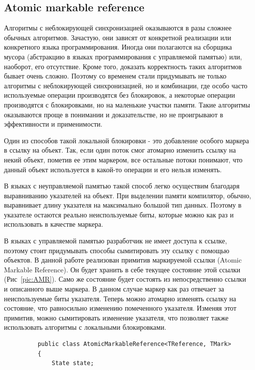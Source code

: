 \documentclass[12pt]{article}
\begin{document}
{			\subsection{Atomic markable reference}
				\par Алгоритмы с неблокирующей синхронизацией оказываются в разы сложнее обычных алгоритмов. Зачастую, они зависят от конкретной реализации или конкретного языка программирования. Иногда они полагаются на сборщика мусора (абстракцию в языках программирования с управляемой памятью) или, наоборот, его отсутствие. Кроме того, доказать корректность таких алгоритмов бывает очень сложно. Поэтому со временем стали придумывать не только алгоритмы с неблокирующей синхронизацией, но и комбинации, где особо часто используемые операции производятся без блокировок, а некоторые операции производятся с блокировками, но на маленькие участки памяти. Такие алгоритмы оказываются проще в понимании и доказательстве, но не проигрывают в эффективности и применимости.  
				\par Один из способов такой локальной блокировки - это добавление особого маркера в ссылку на объект. Так, если один поток смог атомарно изменить ссылку на некий объект, пометив ее этим маркером, все остальные потоки понимают, что данный объект используется в какой-то операции и его нельзя изменять. 
				\par В языках с неуправляемой памятью такой способ легко осуществим благодаря выравниванию указателей на объект. При выделении памяти компилятор, обычно, выравнивает длину указателя на максимально большой тип данных. Поэтому в указателе остаются реально неиспользуемые биты, которые можно как раз и использовать в качестве маркера.
				\par В языках с управляемой памятью разработчик не имеет доступа к ссылке, поэтому стоит придумывать способы сымитировать эту ссылку с помощью объектов. В данной работе реализован примитив маркируемой ссылки (Atomic Markable Reference). Он будет хранить в себе текущее состояние этой ссылки (Рис~\ref{pic:AMR}). Само же состояние будет состоять из непосредственно ссылки и описанного выше маркера. В данном случае маркер как раз отвечает за неиспользуемые биты указателя. Теперь можно атомарно изменять ссылку на состояние, что равносильно изменению помеченного указателя. Изменяя этот примитив, можно сымитировать изменение указателя, что позволяет также использовать алгоритмы с локальными блокировками. 		
				\begin{figure}[h]
					\begin{lstlisting}
	public class AtomicMarkableReference<TReference, TMark>
	{
		State state;
		

\end{lstlisting}
\end{figure}}
\end{document}
